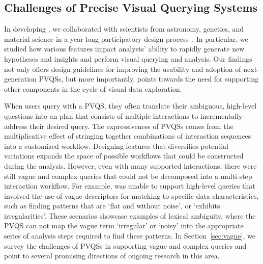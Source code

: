 \subsection{Challenges of Precise Visual Querying Systems}
\par In developing \zv, we collaborated with scientists from astronomy, genetics, and material science in a year-long participatory design process~\cite{Lee2017}. In particular, we studied how various features impact analysts' ability to rapidly generate new hypotheses and insights and perform visual querying and analysis. Our findings not only offers design guidelines for improving the usability and adoption of next-generation PVQSs, but more importantly, points towards the need for supporting other components in the cycle of visual data exploration. %

\par When users query with a PVQS, they often translate their ambiguous, high-level questions into an plan that consists of multiple interactions to incrementally address their desired query. The expressiveness of PVQSs comes from the multiplicative effect of stringing together combinations of interaction sequences into a customized workflow. Designing features that diversifies potential variations expands the space of possible workflows that could be constructed during the analysis. However, even with many supported interactions, there were still vague and complex queries that could not be decomposed into a multi-step interaction workflow. For example, \zv was unable to support high-level queries that involved the use of vague descriptors for matching to specific data characteristics, such as finding patterns that are `flat and without noise', or `exhibits irregularities'. These scenarios showcase examples of lexical ambiguity, where the PVQS can not map the vague term `irregular' or `noisy' into the appropriate series of analysis steps required to find these patterns. In Section~\ref{sec:vague}, we survey the challenges of PVQSs in supporting vague and complex queries and point to several promising directions of ongoing research in this area.

